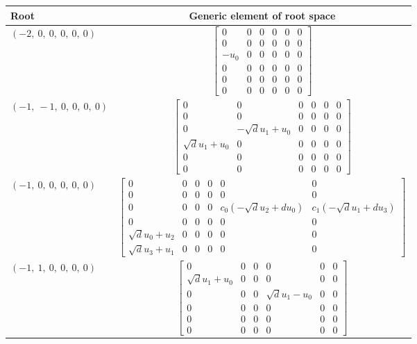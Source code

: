 \documentclass[11pt]{article}
\theoremstyle{definition}
\begin{document}
\bigskip

\noindent \begin{longtable}{|l|c|}
    \hline
    \textbf{Root} & \textbf{Generic element of root space} \\
    \hline
    \endhead
    $\left( -2, \  0, \  0, \  0, \  0, \  0\right)$ & ${\left[\begin{matrix}0 & 0 & 0 & 0 & 0 & 0\\0 & 0 & 0 & 0 & 0 & 0\\- u_{0} & 0 & 0 & 0 & 0 & 0\\0 & 0 & 0 & 0 & 0 & 0\\0 & 0 & 0 & 0 & 0 & 0\\0 & 0 & 0 & 0 & 0 & 0\end{matrix}\right]}$ \\
    \hline
    $\left( -1, \  -1, \  0, \  0, \  0, \  0\right)$ & ${\left[\begin{matrix}0 & 0 & 0 & 0 & 0 & 0\\0 & 0 & 0 & 0 & 0 & 0\\0 & - \sqrt{d} u_{1} + u_{0} & 0 & 0 & 0 & 0\\\sqrt{d} u_{1} + u_{0} & 0 & 0 & 0 & 0 & 0\\0 & 0 & 0 & 0 & 0 & 0\\0 & 0 & 0 & 0 & 0 & 0\end{matrix}\right]}$ \\
    \hline
    $\left( -1, \  0, \  0, \  0, \  0, \  0\right)$ & ${\left[\begin{matrix}0 & 0 & 0 & 0 & 0 & 0\\0 & 0 & 0 & 0 & 0 & 0\\0 & 0 & 0 & 0 & c_{0} \left(- \sqrt{d} u_{2} + d u_{0}\right) & c_{1} \left(- \sqrt{d} u_{1} + d u_{3}\right)\\0 & 0 & 0 & 0 & 0 & 0\\\sqrt{d} u_{0} + u_{2} & 0 & 0 & 0 & 0 & 0\\\sqrt{d} u_{3} + u_{1} & 0 & 0 & 0 & 0 & 0\end{matrix}\right]}$ \\
    \hline
    $\left( -1, \  1, \  0, \  0, \  0, \  0\right)$ & ${\left[\begin{matrix}0 & 0 & 0 & 0 & 0 & 0\\\sqrt{d} u_{1} + u_{0} & 0 & 0 & 0 & 0 & 0\\0 & 0 & 0 & \sqrt{d} u_{1} - u_{0} & 0 & 0\\0 & 0 & 0 & 0 & 0 & 0\\0 & 0 & 0 & 0 & 0 & 0\\0 & 0 & 0 & 0 & 0 & 0\end{matrix}\right]}$ \\

\end{longtable}
\end{document}
